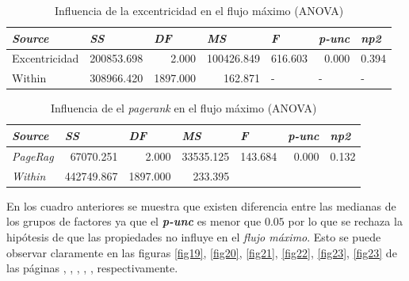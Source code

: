\documentclass{article}
\begin{document}
\begin{table}[htbp]
  \centering
  \caption{Influencia de la excentricidad en el flujo máximo (ANOVA)}
    \begin{tabular}{lrrrlll}
    \toprule
    \textit{\textbf{Source}} & \multicolumn{1}{l}{\textit{\textbf{SS}}} & \multicolumn{1}{l}{\textit{\textbf{DF}}} & \multicolumn{1}{l}{\textit{\textbf{MS}}} & \textit{\textbf{F}} & \textit{\textbf{p-unc}} & \textit{\textbf{np2}} \\
    \midrule
    Excentricidad & 200853.698 & 2.000 & 100426.849 & \multicolumn{1}{r}{616.603} & \multicolumn{1}{r}{0.000} & \multicolumn{1}{r}{0.394} \\
    Within & 308966.420 & 1897.000 & 162.871 & -     & -     & - \\
    \bottomrule
    \end{tabular}%
  \label{tab:t25}%
\end{table}%

\begin{table}[htbp]
  \centering
  \caption{Influencia de el \textit{pagerank} en el flujo máximo (ANOVA)}
    \begin{tabular}{lrrrrrr}
    \toprule
    \textit{\textbf{Source}} & \multicolumn{1}{l}{\textit{\textbf{SS}}} & \multicolumn{1}{l}{\textit{\textbf{DF}}} & \multicolumn{1}{l}{\textit{\textbf{MS}}} & \multicolumn{1}{l}{\textit{\textbf{F}}} & \multicolumn{1}{l}{\textit{\textbf{p-unc}}} & \multicolumn{1}{l}{\textit{\textbf{np2}}} \\
    \midrule
    \textit{PageRag} & 67070.251 & 2.000 & 33535.125 & 143.684 & 0.000 & 0.132 \\
    \textit{Within} & 442749.867 & 1897.000 & 233.395 &       &       &  \\
    \bottomrule
    \end{tabular}%
  \label{tab:t26}%
\end{table}%

En los cuadro anteriores se muestra que existen diferencia entre las medianas de los grupos de factores ya que el \textbf{\emph{p-unc}} es menor que $0.05$ por lo que se rechaza la hipótesis de que las propiedades no influye en el \textit{flujo máximo}. Esto se puede observar claramente en las figuras \ref{fig19}, \ref{fig20}, \ref{fig21}, \ref{fig22}, \ref{fig23}, \ref{fig23} de las páginas \pageref{fig19}, \pageref{fig20}, \pageref{fig21}, \pageref{fig22}, \pageref{fig23}, \pageref{fig24} respectivamente.
\end{document}
